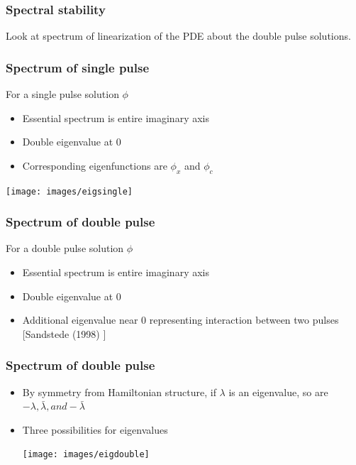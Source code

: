 \documentclass[16pt]{beamer}
\begin{document}
\begin{frame}
	\frametitle{Spectral stability}
	\fontsize{16}{7.2}\selectfont
	Look at spectrum of linearization of the PDE about the double pulse solutions.
\end{frame}

\begin{frame}
	\frametitle{Spectrum of single pulse}
	\fontsize{16}{7.2}\selectfont
	For a single pulse solution $\phi$
	\begin{itemize}
		\item Essential spectrum is entire imaginary axis
		\vspace{0.5cm}
		\item Double eigenvalue at 0
		\vspace{0.5cm}
		\item Corresponding eigenfunctions are $\phi_x$ and $\phi_c$
	\end{itemize}
	\begin{center}
		\texttt{[image: images/eigsingle]}
	\end{center}
\end{frame}

\begin{frame}
	\frametitle{Spectrum of double pulse}
	\fontsize{16}{7.2}\selectfont
	For a double pulse solution $\phi$
	\begin{itemize}
		\item Essential spectrum is entire imaginary axis
		\vspace{0.5cm}
		\item Double eigenvalue at 0
		\vspace{0.5cm}
		\item Additional eigenvalue near 0 representing interaction between two pulses \footnotesize [Sandstede (1998) ]
	\end{itemize}
\end{frame}

\begin{frame}
	\frametitle{Spectrum of double pulse}
	\fontsize{16}{7.2}\selectfont
	\begin{itemize}
		\item By symmetry from Hamiltonian structure, if $\lambda$ is an eigenvalue, so are $-\lambda, \bar{\lambda}, and -\bar{\lambda}$
		\vspace{0.5cm}
		\item Three possibilities for eigenvalues
		\begin{center}
			\texttt{[image: images/eigdouble]}
		\end{center}
	\end{itemize}
\end{frame}
\end{document}
